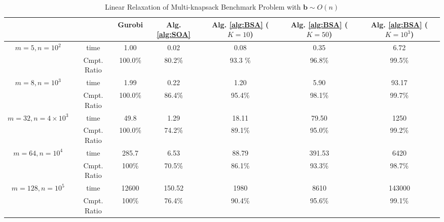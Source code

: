 \documentclass{article} %
\begin{document}
\begin{table}[ht!]
    \centering
    \small
    \begin{tabular}{cc|c|c|c|c|c}
    \toprule
         && Gurobi  & Alg. \ref{alg:SOA} & Alg. \ref{alg:BSA} ($K=10$) & Alg. \ref{alg:BSA} ($K=50$) & Alg. \ref{alg:BSA}  ($K=10^3$) \\
         \midrule
   \multirow{2}{*}{\scriptsize $m=5, n=10^2$}  & time & 1.00 & 0.02 & 0.08 & 0.35 & 6.72 \\
   & Cmpt. Ratio &100.0\% & 80.2\% & 93.3 \% & 96.8\% & 99.5\%  \\
\midrule
  \multirow{2}{*}{\scriptsize $m=8, n=10^3$} &  time  & 1.99 & 0.22 & 1.20 & 5.90 & 93.17  \\ 
   &Cmpt. Ratio & 100.0\% & 86.4\% & 95.4\% & 98.1\% & 99.7\%   \\
\midrule
    \multirow{2}{*}{\scriptsize $m=32, n=4\times10^3$} &  time   &  49.8  & 1.29 & 18.11 & 79.50 & 1250  \\ 
  & Cmpt. Ratio & 100.0\% & 74.2\% & 89.1\% & 95.0\% & 99.2\% \\
\midrule
    \multirow{2}{*}{\scriptsize $m=64, n=10^4$} &  time   &  285.7  & 6.53 & 88.79 & 391.53 & 6420 \\ 
  & Cmpt. Ratio & 100\% & 70.5\% & 86.1\% & 93.3\% & 98.7\% \\ 
\midrule
    \multirow{2}{*}{\scriptsize $m=128, n=10^5$} &  time   &  12600  & 150.52 & 1980 & 8610 & 143000  \\ 
  & Cmpt. Ratio & 100\% & 76.4\% & 90.4\% &  95.6\% & 99.1\% \\  
   \bottomrule
    \end{tabular}
        \caption{Linear Relaxation of Multi-knapsack Benchmark Problem with $\bm{b}\sim O(n)$}
    \label{tab:sol_1}
\end{table}
\end{document}

